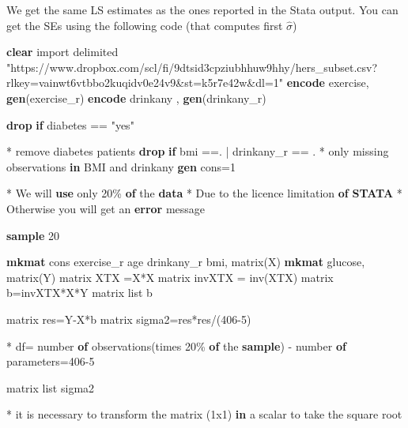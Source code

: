 \documentclass[
  letterpaper,
  DIV=11,
  numbers=noendperiod]{scrreprt}
\newenvironment{Shaded}{\begin{snugshade}}{\end{snugshade}}
\newcommand{\FunctionTok}[1]{\textcolor[rgb]{0.28,0.35,0.67}{#1}}
\newcommand{\KeywordTok}[1]{\textcolor[rgb]{0.00,0.23,0.31}{\textbf{#1}}}
\newcommand{\NormalTok}[1]{\textcolor[rgb]{0.00,0.23,0.31}{#1}}
\newcommand{\OtherTok}[1]{\textcolor[rgb]{0.00,0.23,0.31}{#1}}
\newcommand{\StringTok}[1]{\textcolor[rgb]{0.13,0.47,0.30}{#1}}
\begin{document}
We get the same LS estimates as the ones reported in the Stata output.
You can get the SEs using the following code (that computes first
\(\hat\sigma\))

\begin{Shaded}
\begin{Highlighting}[]
\KeywordTok{clear}
\NormalTok{import delimited }\StringTok{"https://www.dropbox.com/scl/fi/9dtsid3cpziubhhuw9hhy/hers\_subset.csv?rlkey=vainwt6vtbbo2kuqidv0e24v9\&st=k5r7e42w\&dl=1"}
\KeywordTok{encode}\NormalTok{  exercise, }\KeywordTok{gen}\NormalTok{(exercise\_r)}
\KeywordTok{encode}\NormalTok{ drinkany , }\KeywordTok{gen}\NormalTok{(drinkany\_r)}

\KeywordTok{drop} \KeywordTok{if}\NormalTok{ diabetes == }\StringTok{"yes"}

\NormalTok{* remove diabetes patients}
\KeywordTok{drop} \KeywordTok{if}\NormalTok{ bmi ==. | drinkany\_r == . }
\NormalTok{* only }\FunctionTok{missing}\NormalTok{ observations }\KeywordTok{in}\NormalTok{ BMI and drinkany}
\KeywordTok{gen}\NormalTok{ cons=1}

\NormalTok{* We will }\KeywordTok{use}\NormalTok{ only 20\% }\KeywordTok{of}\NormalTok{ the }\KeywordTok{data}
\NormalTok{* Due to the licence limitation }\KeywordTok{of} \KeywordTok{STATA}
\NormalTok{* Otherwise you will }\FunctionTok{get}\NormalTok{ an }\KeywordTok{error}\NormalTok{ message}

\KeywordTok{sample}\NormalTok{ 20}

\KeywordTok{mkmat}\NormalTok{ cons exercise\_r age drinkany\_r bmi, }\FunctionTok{matrix}\NormalTok{(X) }
\KeywordTok{mkmat}\NormalTok{ glucose, }\FunctionTok{matrix}\NormalTok{(Y)}
\FunctionTok{matrix}\NormalTok{ XTX =X\textquotesingle{}*X}
\FunctionTok{matrix}\NormalTok{ invXTX = }\FunctionTok{inv}\NormalTok{(XTX)}
\FunctionTok{matrix}\NormalTok{ b=invXTX*X\textquotesingle{}*Y}
\FunctionTok{matrix} \OtherTok{list}\NormalTok{ b }


\FunctionTok{matrix}\NormalTok{ res=Y{-}X*b}
\FunctionTok{matrix}\NormalTok{ sigma2=res\textquotesingle{}*res/(406{-}5)}

\NormalTok{* df= number }\KeywordTok{of}\NormalTok{ observations(times 20\% }\KeywordTok{of}\NormalTok{ the }\KeywordTok{sample}\NormalTok{) {-} number }\KeywordTok{of}\NormalTok{ parameters=406{-}5}

\FunctionTok{matrix} \OtherTok{list}\NormalTok{ sigma2}

\NormalTok{* it is necessary to transform the }\FunctionTok{matrix}\NormalTok{ (1x1) }\KeywordTok{in}\NormalTok{ a }\FunctionTok{scalar}\NormalTok{ to take the square root}


\end{Highlighting}
\end{Shaded}
\end{document}
